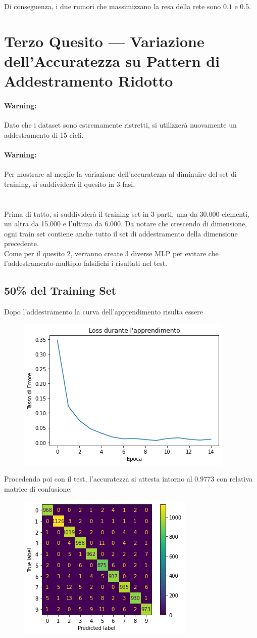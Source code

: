 \documentclass[12pt, a4paper]{article}
\begin{document}
Di conseguenza, i due rumori che massimizzano la resa della rete sono \(0.1\) e \(0.5\).

\newpage
\section{Terzo Quesito --- Variazione dell'Accuratezza su Pattern di Addestramento Ridotto}
\paragraph{Warning: }Dato che i dataset sono estremamente ristretti, si utilizzerà nuovamente un addestramento di 15 cicli.
\paragraph{Warning: }Per mostrare al meglio la variazione dell'accuratezza al diminuire del set di training, si suddividerà il quesito in 3 fasi.\\\\
\\
Prima di tutto, si suddividerà il training set in 3 parti, una da 30.000 elementi, un altra da 15.000 e l'ultima da 6.000. Da notare che crescendo di dimensione, ogni train set contiene anche tutto il set di addestramento della dimensione precedente. \\
Come per il quesito 2, verranno create 3 diverse MLP per evitare che l'addestramento multiplo falsifichi i risultati nel test.
\subsection{50\% del Training Set}
Dopo l'addestramento la curva dell'apprendimento risulta essere
\begin{figure}[H]
    \centering
    \includegraphics[width=.5\textwidth]{Set50.png}
\end{figure}

Procedendo poi con il test, l'accuratezza si attesta intorno al \(0.9773\) con relativa matrice di confusione:
\begin{figure}[H]
    \centering
    \includegraphics[width=.5\textwidth]{Matrix50.png}
\end{figure}
\end{document}
